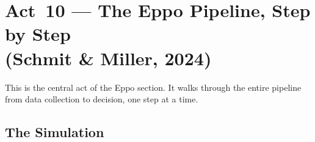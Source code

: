\documentclass[12pt, a4paper]{article}
\begin{document}
\newpage
\section{Act~10 --- The Eppo Pipeline, Step by Step\\
         (Schmit \& Miller, 2024)}

This is the central act of the Eppo section.  It walks through the entire
pipeline from data collection to decision, one step at a time.

\subsection{The Simulation}
\end{document}
